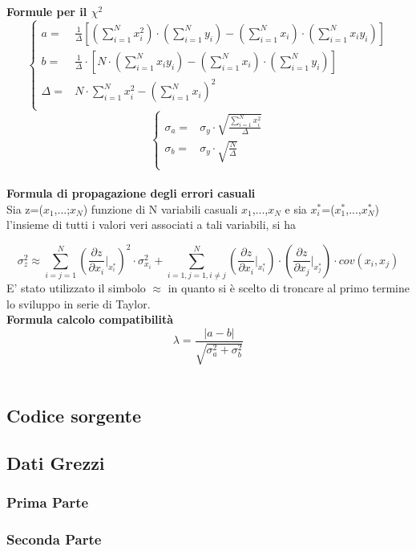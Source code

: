 \documentclass[a4paper,11pt,oneside]{article}
\begin{document}
\textbf{Formule per il ${\chi}^2$}
\begin{equation*}
        \begin{cases}
    a=&\frac{1}{\Delta}[(\sum\limits_{i=1}^{N}{x_{i}^{2}})\cdot(\sum\limits_{i=1}^{N}{y_{i}})-(\sum\limits_{i=1}^{N}{x_{i}})\cdot(\sum\limits_{i=1}^{N}{x_{i}y_{i}})] \\ 
    b=&\frac{1}{\Delta }\cdot \left [N\cdot \left ( \sum\limits_{i=1}^{N}x_i y_i \right )-\left ( \sum\limits_{i=1}^{N}x_i \right )\cdot \left ( \sum\limits_{i=1}^{N}y_i \right )  \right ]\\
    \Delta=& N\cdot \sum\limits_{i=1}^{N} x_i^{2} - \left ( \sum\limits_{i=1}^{N}x_i \right )^{2}\\
    \end{cases}
\end{equation*}
\begin{equation*}
    \begin{cases}
    \sigma_{a}=&\sigma_{y}\cdot\sqrt{\frac{\sum_{i=1}^{N}{x_{i}^{2}}}{\Delta}} \\
    \sigma_{b}=&\sigma_y\cdot \sqrt{\frac{N}{\Delta }}\\
    \end{cases}
    \label{equation:err_chi_quadro}
\end{equation*}
\\
\textbf{Formula di propagazione degli errori casuali}\\

Sia z=($x_1$,...;$x_N$) funzione di N variabili casuali $x_1$,...,$x_N$ e sia ${x_i^\ast}$=($x_1^\ast$,...,$x_N^{\ast}$) l'insieme di tutti i valori veri associati a tali variabili, si ha 

\begin{equation*}
    \sigma_z^{2}\approx  \sum_{i=j=1}^{N}\left ( \frac{\partial z}{\partial x_i}\Big|_{x_i^{\ast}} \right )^{2}\cdot\sigma_{x_i}^{2} +\sum_{i=1,j=1,i\neq j}^{N}\left (\frac{\partial z }{\partial x_i}\Big|_{x_i^{\ast}} \right ) \cdot \left ( \frac{\partial z}{\partial x_j} \Big|_{x_j^{\ast}} \right )\cdot cov(x_i,x_j)\label{eq:prop_errori}
\end{equation*}
E' stato utilizzato il simbolo $\approx$ in quanto si è scelto di troncare al primo termine lo sviluppo in serie di Taylor.\\


\textbf{Formula calcolo compatibilità}\\
\begin{equation*}
    \lambda=\frac{\left|a-b\right|}{\sqrt{\sigma^{2}_{a}+\sigma^{2}_{b}}}
\end{equation*}\\

\subsection{Codice sorgente}
\subsection{Dati Grezzi}
\subsubsection{Prima Parte}
\subsubsection{Seconda Parte}
\end{document}
